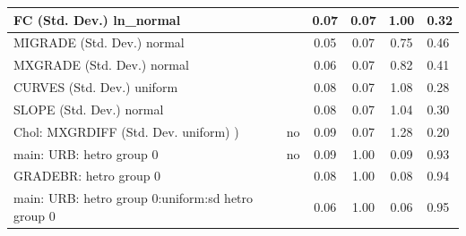 \begin{table}
\begin{center}
\begin{tabular}{|l|l|c|c|c|l|}
			\hline
			FC (Std. Dev.) ln_normal &  & 0.07 & 0.07 & 1.00 & 0.32 \\
			\hline
			MIGRADE (Std. Dev.) normal &  & 0.05 & 0.07 & 0.75 & 0.46 \\
			\hline
			MXGRADE (Std. Dev.) normal &  & 0.06 & 0.07 & 0.82 & 0.41 \\
			\hline
			CURVES (Std. Dev.) uniform &  & 0.08 & 0.07 & 1.08 & 0.28 \\
			\hline
			SLOPE (Std. Dev.) normal &  & 0.08 & 0.07 & 1.04 & 0.30 \\
			\hline
			 Chol: MXGRDIFF (Std. Dev. uniform) ) & no & 0.09 & 0.07 & 1.28 & 0.20 \\
			\hline
			main: URB: hetro group 0 & no & 0.09 & 1.00 & 0.09 & 0.93 \\
			\hline
			GRADEBR: hetro group 0 &  & 0.08 & 1.00 & 0.08 & 0.94 \\
			\hline
			main: URB: hetro group 0:uniform:sd  hetro group 0 &  & 0.06 & 1.00 & 0.06 & 0.95 \\
			\hline
		\end{tabular}
	\end{center}
\end{table}